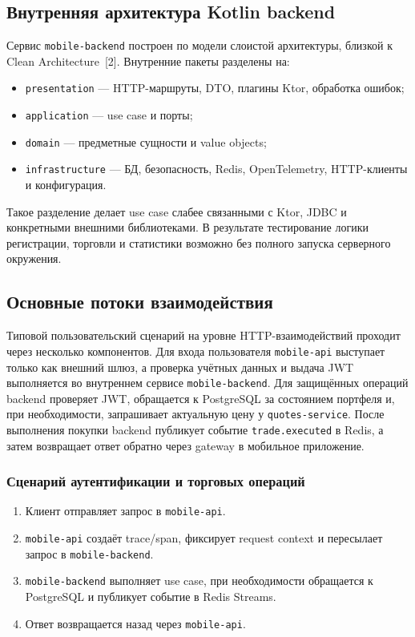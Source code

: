 \documentclass[12pt,a4paper]{article}
\begin{document}
\subsection{Внутренняя архитектура Kotlin backend}

Сервис \texttt{mobile-backend} построен по модели слоистой архитектуры, близкой к Clean Architecture~[2]. Внутренние пакеты разделены на:

\begin{itemize}[leftmargin=1.2cm]
    \item \texttt{presentation} --- HTTP-маршруты, DTO, плагины Ktor, обработка ошибок;
    \item \texttt{application} --- use case и порты;
    \item \texttt{domain} --- предметные сущности и value objects;
    \item \texttt{infrastructure} --- БД, безопасность, Redis, OpenTelemetry, HTTP-клиенты и конфигурация.
\end{itemize}

Такое разделение делает use case слабее связанными с Ktor, JDBC и конкретными внешними библиотеками. В результате тестирование логики регистрации, торговли и статистики возможно без полного запуска серверного окружения.

\subsection{Основные потоки взаимодействия}

Типовой пользовательский сценарий на уровне HTTP-взаимодействий проходит через несколько компонентов. Для входа пользователя \texttt{mobile-api} выступает только как внешний шлюз, а проверка учётных данных и выдача JWT выполняется во внутреннем сервисе \texttt{mobile-backend}. Для защищённых операций backend проверяет JWT, обращается к PostgreSQL за состоянием портфеля и, при необходимости, запрашивает актуальную цену у \texttt{quotes-service}. После выполнения покупки backend публикует событие \texttt{trade.executed} в Redis, а затем возвращает ответ обратно через gateway в мобильное приложение.

\subsubsection{Сценарий аутентификации и торговых операций}

\begin{enumerate}[leftmargin=1.2cm]
    \item Клиент отправляет запрос в \texttt{mobile-api}.
    \item \texttt{mobile-api} создаёт trace/span, фиксирует request context и пересылает запрос в \texttt{mobile-backend}.
    \item \texttt{mobile-backend} выполняет use case, при необходимости обращается к PostgreSQL и публикует событие в Redis Streams.
    \item Ответ возвращается назад через \texttt{mobile-api}.
\end{enumerate}
\end{document}
